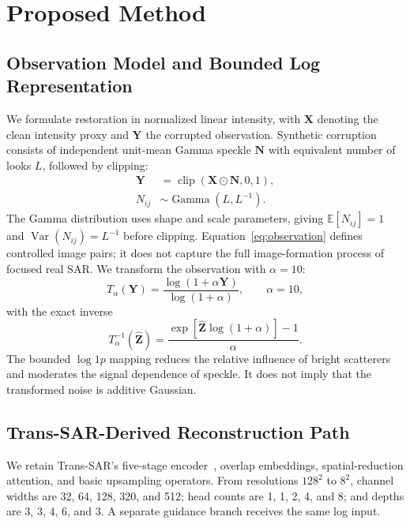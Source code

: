 \documentclass[conference]{IEEEtran}
\newcommand{\vect}[1]{\bm{#1}}
\begin{document}
\section{Proposed Method}
\subsection{Observation Model and Bounded Log Representation}
We formulate restoration in normalized linear intensity, with \(\vect{X}\) denoting the clean intensity proxy and \(\vect{Y}\) the corrupted observation. Synthetic corruption consists of independent unit-mean Gamma speckle \(\vect{N}\) with equivalent number of looks \(L\), followed by clipping:
\begin{equation}
\begin{aligned}
\vect{Y} &= \operatorname{clip}(\vect{X}\odot\vect{N},0,1),\\
N_{ij} &\sim \operatorname{Gamma}(L,L^{-1}).
\end{aligned}
\label{eq:observation}
\end{equation}
The Gamma distribution uses shape and scale parameters, giving \(\mathbb{E}[N_{ij}]=1\) and \(\operatorname{Var}(N_{ij})=L^{-1}\) before clipping. Equation~\eqref{eq:observation} defines controlled image pairs; it does not capture the full image-formation process of focused real SAR. We transform the observation with \(\alpha=10\):
\begin{equation}
T_{\alpha}(\vect{Y})=
\frac{\log(1+\alpha\vect{Y})}{\log(1+\alpha)},
\qquad \alpha=10,
\label{eq:log}
\end{equation}
with the exact inverse
\begin{equation}
T_{\alpha}^{-1}(\widehat{\vect{Z}})=
\frac{\exp[\widehat{\vect{Z}}\log(1+\alpha)]-1}{\alpha}.
\label{eq:inverse}
\end{equation}
The bounded \(\log1p\) mapping reduces the relative influence of bright scatterers and moderates the signal dependence of speckle. It does not imply that the transformed noise is additive Gaussian.

\subsection{Trans-SAR-Derived Reconstruction Path}
We retain Trans-SAR's five-stage encoder~\cite{perera2022}, overlap embeddings, spatial-reduction attention, and basic upsampling operators. From resolutions \(128^2\) to \(8^2\), channel widths are 32, 64, 128, 320, and 512; head counts are 1, 1, 2, 4, and 8; and depths are 3, 3, 4, 6, and 3. A separate guidance branch receives the same log input.
\end{document}
